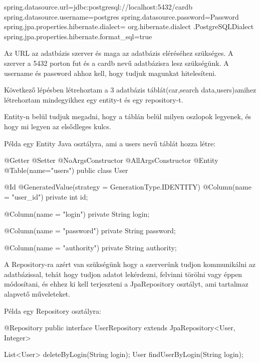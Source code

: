 \begin{java}
spring.datasource.url=jdbc:postgresql://localhost:5432/cardb
spring.datasource.username=postgres
spring.datasource.password=Password
spring.jpa.properties.hibernate.dialect= org.hibernate.dialect
                                          .PostgreSQLDialect
spring.jpa.properties.hibernate.format_sql=true
\end{java}

Az URL az adatbázis szerver és maga az adatbázis eléréséhez szükséges. A szerver a 5432 porton fut és a cardb nevű adatbázisra lesz szükségünk.
A username és password ahhoz kell, hogy tudjuk magunkat hitelesíteni.

Következő lépésben létrehoztam a 3 adatbázis táblát(car,search data,users)amihez létrehoztam mindegyikhez egy entity-t és egy repository-t.

Entity-n belül tudjuk megadni, hogy a táblán belül milyen oszlopok legyenek, és hogy mi legyen az elsődleges kulcs.

Példa egy Entity Java osztályra, ami a users nevű táblát hozza létre:

\begin{java}
@Getter
@Setter
@NoArgsConstructor
@AllArgsConstructor
@Entity
@Table(name="users")
public class User {
    @Id
    @GeneratedValue(strategy = GenerationType.IDENTITY)
    @Column(name = "user_id")
    private int id;

    @Column(name = "login")
    private String login;

    @Column(name = "password")
    private String password;

    @Column(name = "authority")
    private String authority;
}
\end{java}

A Repository-ra azért van szükségünk hogy a szerverünk tudjon kommunikálni az adatbázissal, tehát hogy tudjon adatot lekérdezni, felvinni törölni vagy éppen módosítani, és ehhez ki kell terjeszteni a JpaRepository osztályt, ami tartalmaz alapvető műveleteket.

Példa egy Repository osztályra:

\begin{java}
@Repository
public interface UserRepository
extends JpaRepository<User, Integer>{

    List<User> deleteByLogin(String login);
    User findUserByLogin(String login);
}
\end{java}
\newpage


